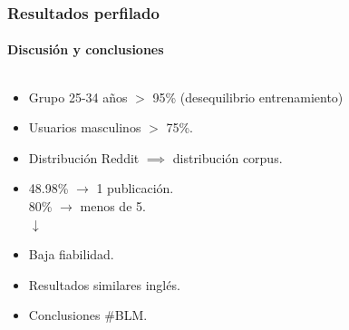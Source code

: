 \documentclass{beamer}
\begin{document}
\begin{frame}
	\frametitle{Resultados perfilado}
	\framesubtitle{Discusión y conclusiones}
	\begin{columns}[T]
		\hspace{-3.5cm}
		\begin{column}{\textwidth}
			\begin{description}[labelwidth=0.01mm]
				\item 
				\begin{itemize}
					\item<1-> Grupo 25-34 años $>$ 95\% (desequilibrio entrenamiento)
					\item<3-> Usuarios masculinos $>$ 75\%.
					\item<4-> Distribución Reddit $\implies$ distribución corpus.
					\item<5-> 48.98\% $\rightarrow$ 1 publicación.\\
					 80\% $\rightarrow$ menos de 5.
					\\ \hspace{2cm}$\downarrow$
					\item <6-> Baja fiabilidad.
					\item <7-> Resultados similares inglés.
					\item <8-> Conclusiones \#BLM.
				\end{itemize}
			\end{description}
			
		\end{column}
		\hspace{-1.5cm}
\end{columns}
\end{frame}
\end{document}
